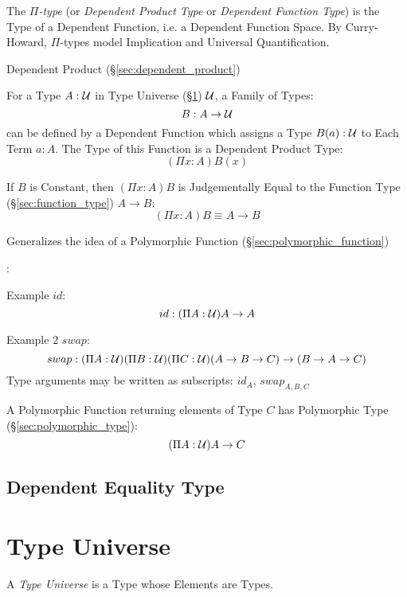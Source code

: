 The \emph{$\Pi$-type} (or \emph{Dependent Product Type} or
\emph{Dependent Function Type}) is the Type of a Dependent Function,
i.e. a Dependent Function Space. By Curry-Howard, $\Pi$-types model
Implication and Universal Quantification.

Dependent Product (\S\ref{sec:dependent_product})

For a Type $A : \mathcal{U}$ in Type Universe
(\S\ref{sec:type_universe}) $\mathcal{U}$, a Family of Types:
\[
  B : A \rightarrow \mathcal{U}
\]
can be defined by a Dependent Function which assigns a Type $B(a) :
\mathcal{U}$ to Each Term $a : A$. The Type of this Function is a
Dependent Product Type:
\[
  (\Pi x:A)B(x)
\]

If $B$ is Constant, then $(\Pi x:A)B$ is Judgementally Equal to the
Function Type (\S\ref{sec:function_type}) $A \rightarrow B$:
\[
  (\Pi x:A)B \equiv A \rightarrow B
\]

Generalizes the idea of a Polymorphic Function
(\S\ref{sec:polymorphic_function})

\cite{hott13}:

Example $id$:
\[
  id : (\Pi A:\mathcal{U}) A \rightarrow A
\]

Example 2 $swap$:
\[
  swap : (\Pi A:\mathcal{U}) (\Pi B:\mathcal{U}) (\Pi C:\mathcal{U})
  (A \rightarrow B \rightarrow C) \rightarrow (B \rightarrow A
  \rightarrow C)
\]
Type arguments may be written as subscripts: $id_A$, $swap_{A,B,C}$

A Polymorphic Function returning elements of Type $C$ has Polymorphic
Type (\S\ref{sec:polymorphic_type}):
\[
  (\Pi A:\mathcal{U}) A \rightarrow C
\]



\subsection{Dependent Equality Type}\label{sec:dependent_equality}



\section{Type Universe}\label{sec:type_universe}

A \emph{Type Universe} is a Type whose Elements are Types.

